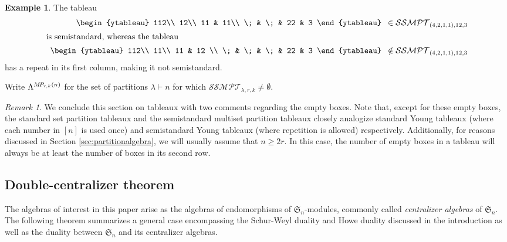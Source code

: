 \documentclass[10pt]{amsart}
\theoremstyle{definition}
\theoremstyle{definition}
\newtheorem{exam}[exam]{Example}
\theoremstyle{plain}
\theoremstyle{remark}
\newtheorem{rema}[rema]{Remark}
\theoremstyle{plain}
\theoremstyle{plain}
\newcommand{\SG}{\mathfrak{S}}
\newcommand{\MP}{{\rm M\!P\!}}
\newcommand{\SSMPT}{\mathcal{SSMPT}}
\newcommand{\inline}[1]{\begin{array}{c}#1\end{array}}
\newcommand{\defn}[1]{\textcolor{defncolor}{\emph{#1}}}
\begin{document}
\begin{exam} The tableau
    \begin{align*}
        \inline{\begin{ytableau}
        112\\
        12\\
        11 & 11\\
        \; & \; & 22 & 3
\end{ytableau}}&\in \SSMPT_{(4,2,1,1),12,3}\\
        \intertext{is semistandard, whereas the tableau}
        \inline{\begin{ytableau}
        112\\
        11\\
        11 & 12 \\
        \; & \; & \; & 22 & 3
\end{ytableau}}&\notin \SSMPT_{(4,2,1,1),12,3}
    \end{align*} has a repeat in its first column, making it not semistandard.
\end{exam}

Write $\Lambda^{\MP_{r,k}(n)}$ for the set of partitions $\lambda\vdash n$ for which $\SSMPT_{\lambda,r,k}\neq\emptyset$. 

\begin{rema} We conclude this section on tableaux with two comments regarding the empty boxes. Note that, except for these empty boxes, the standard set partition tableaux and the semistandard multiset partition tableaux closely analogize standard Young tableaux (where each number in $[n]$ is used once) and semistandard Young tableaux (where repetition is allowed) respectively. Additionally, for reasons discussed in Section \ref{sec:partitionalgebra}, we will usually assume that $n\geq2r$. In this case, the number of empty boxes in a tableau will always be at least the number of boxes in its second row.
\end{rema}

\subsection{Double-centralizer theorem}

The algebras of interest in this paper arise as the algebras of endomorphisms of $\SG_n$-modules, commonly called \defn{centralizer algebras} of $\SG_n$. The following theorem summarizes a general case encompassing the Schur-Weyl duality and Howe duality discussed in the introduction as well as the duality between $\SG_n$ and its centralizer algebras.
\end{document}
